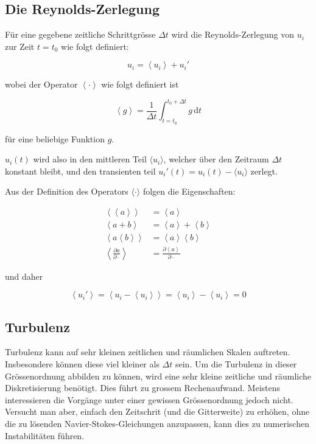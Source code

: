 \subsection{Die Reynolds-Zerlegung}

Für eine gegebene zeitliche Schrittgrösse $\Delta t$ wird die Reynolds-Zerlegung von $u_i$ zur Zeit $t = t_0$
wie folgt definiert:

\newcommand{\ravg}[1]{\left\langle #1 \right\rangle}
\newcommand{\rdecomp}[1]{\ravg{#1} + #1'}

\begin{equation}
    \label{reynolds:eqs:reynolds-decomp}
    u_i = \rdecomp{u_i}
\end{equation}

wobei der Operator $\ravg{\cdot}$ wie folgt definiert ist

\begin{equation}
    \ravg{g} = \frac{1}{\Delta t}\int_{t=t_0}^{t_0 + \Delta t} g \mathrm{\,d}t
\end{equation}

für eine beliebige Funktion $g$.

$u_i(t)$ wird also in den mittleren Teil $\langle u_i \rangle$, welcher über den Zeitraum
$\Delta t$ konstant bleibt, und den transienten teil $u_i'(t) = u_i(t) - \langle u_i \rangle$
zerlegt.

Aus der Definition des Operators $\langle \cdot \rangle$ folgen die Eigenschaften:

\begin{align}
    \ravg{\ravg{a}} &= \ravg{a} \\
    \ravg{a + b} &= \ravg{a} + \ravg{b} \\
    \ravg{a \ravg{b}} &= \ravg{a} \ravg{b} \\
    \ravg{\frac{\partial a}{\partial \cdot}} &= \frac{\partial \ravg{a}}{\partial \cdot}
\end{align}

und daher

\begin{equation}
    \label{reynolds:eqs:trans-cancel}
    \ravg{u_i'} = \ravg{u_i - \ravg{u_i}} = \ravg{u_i} - \ravg{u_i} = 0
\end{equation}

\subsection{Turbulenz}

Turbulenz kann auf sehr kleinen zeitlichen und räumlichen Skalen auftreten.
Insbesondere können diese viel kleiner als $\Delta t$ sein. Um die Turbulenz in dieser
Grössenordnung abbilden zu können, wird eine sehr kleine zeitliche und räumliche Diskretisierung
benötigt. Dies führt zu grossem Rechenaufwand. Meistens interessieren die Vorgänge unter
einer gewissen Grössenordnung jedoch nicht. Versucht man aber, einfach den Zeitschrit
(und die Gitterweite) zu erhöhen, ohne die zu lösenden Navier-Stokes-Gleichungen
anzupassen, kann dies zu numerischen Instabilitäten führen.

